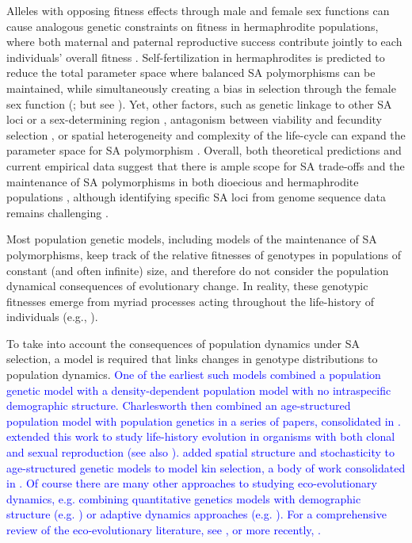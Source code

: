 \documentclass[11pt]{article}
\begin{document}
Alleles with opposing fitness effects through male and female sex functions can cause analogous genetic constraints on fitness in hermaphrodite populations, where both maternal and paternal reproductive success contribute jointly to each individuals' overall fitness \citep{LloydWebb1986, WebbLloyd1986, Abbott2011, JordanConnallon2014}. Self-fertilization in hermaphrodites is predicted to reduce the total parameter space where balanced SA polymorphisms can be maintained, while simultaneously creating a bias in selection through the female sex function (\citealt{JordanConnallon2014,Glemin2021}; but see \citealt{Tazzyman2015}). Yet, other factors, such as genetic linkage to other SA loci or a sex-determining region \citep{Otto2011, JordanCharlesworth2012, Olito2017, Olito2019}, antagonism between viability and fecundity selection \citep{Glemin2021}, or spatial heterogeneity and complexity of the life-cycle can expand the parameter space for SA polymorphism \citep{Olito-etal-2018,ConnallonSharmaOlito2019, Glemin2021}. Overall, both theoretical predictions and current empirical data suggest that there is ample scope for SA trade-offs and the maintenance of SA polymorphisms in both dioecious and hermaphrodite populations \citep{Abbott2011, WangBarrett2020}, although identifying specific SA loci from genome sequence data remains challenging \citep{RuzickaESEB2020}.

Most population genetic models, including models of the maintenance of SA polymorphisms, keep track of the relative fitnesses of genotypes in populations of constant (and often infinite) size, and therefore do not consider the population dynamical consequences of evolutionary change. In reality, these genotypic fitnesses emerge from myriad processes acting throughout the life-history of individuals (e.g., \citealt {johnston2013life, merot2020balancing}). 

To take into account the consequences of population dynamics under SA selection, a model is required that links changes in genotype distributions to population dynamics. \textcolor{blue}{One of the earliest such models \citep{roughgarden1971density} combined a population genetic model with a density-dependent population model with no intraspecific demographic structure. Charlesworth then combined an age-structured population model with population genetics in a series of papers, consolidated in \cite{BCharlesworth1991}. \cite{orive1995senescence} extended this work to study life-history evolution in organisms with both clonal and sexual reproduction (see also \cite{orive2001somatic}).  \cite{ronce2000kin} added spatial structure and stochasticity to age-structured genetic models to model kin selection, a body of work consolidated in \cite{rousset2004genetic}. Of course there are many other approaches to studying eco-evolutionary dynamics, e.g. combining quantitative genetics models with demographic structure (e.g. \cite{coulson2006putting,barfield2011evolution,childs2016evolution,orive2017effects}) or adaptive dynamics approaches (e.g. \cite{dieckmann2002adaptive,durinx2008adaptive,ten2020habitat}). For a comprehensive review of the eco-evolutionary literature, see \cite{fussmann2007eco}, or more recently, \cite{govaert2019eco}.}
  
\end{document}
